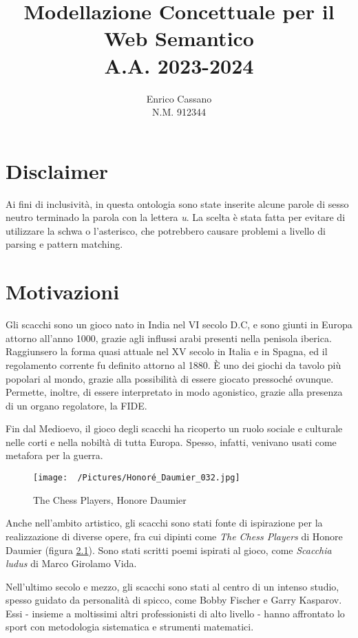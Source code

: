 \documentclass[12pt]{book}
\title{Modellazione Concettuale per il Web Semantico \\ A.A. 2023-2024}
\author{Enrico Cassano \\ N.M. 912344}
\date{}
\begin{document}
\maketitle

\tableofcontents

\chapter{Disclaimer}

Ai fini di inclusività, in questa ontologia sono state inserite alcune
parole di sesso neutro terminado la parola con la lettera
\textit{u}. La scelta è stata fatta per evitare di utilizzare la schwa
o l'asterisco, che potrebbero causare problemi a livello di parsing e
pattern matching.

\chapter{Motivazioni}

Gli scacchi sono un gioco nato in India nel VI secolo D.C, e sono
giunti in Europa attorno all'anno 1000, grazie agli influssi arabi
presenti nella penisola iberica. Raggiunsero la forma quasi attuale nel XV
secolo in Italia e in Spagna, ed il regolamento corrente fu definito
attorno al 1880. È uno dei giochi da tavolo più popolari al mondo,
grazie alla possibilità di essere giocato pressoché ovunque. Permette,
inoltre, di essere interpretato in modo agonistico,
grazie alla presenza di un organo regolatore, la FIDE.

Fin dal Medioevo, il gioco degli scacchi ha ricoperto un ruolo sociale
e culturale nelle corti e nella nobiltà di tutta Europa. Spesso, infatti,
venivano usati come metafora per la guerra.


\begin{figure}[h]
  \caption{The Chess Players, Honore Daumier}
  \centering
  \label{fig:chessplayers}
  \texttt{[image: ~/Pictures/Honoré\_Daumier\_032.jpg]}
\end{figure} 

Anche nell'ambito artistico, gli scacchi sono stati fonte di
ispirazione per la realizzazione di diverse opere, fra cui dipinti
come \textit{The Chess Players} di Honore Daumier (figura
\ref{fig:chessplayers}). Sono stati scritti poemi ispirati al gioco,
come \textit{Scacchia ludus} di Marco Girolamo Vida.

Nell'ultimo secolo e mezzo, gli scacchi sono stati al centro di un intenso studio,
spesso guidato da personalità di spicco, come Bobby Fischer e Garry
Kasparov. Essi - insieme a moltissimi altri professionisti di alto
livello - hanno affrontato lo
sport con metodologia sistematica e strumenti matematici.
\end{document}
